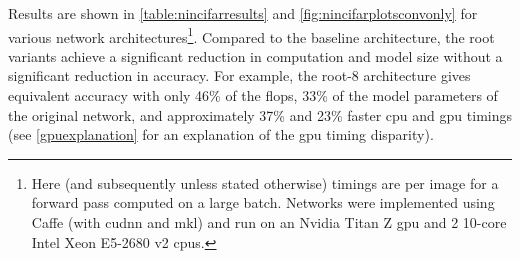 \documentclass[thesis]{subfiles}
\begin{document}
	Results are shown in \cref{table:nincifarresults} and \cref{fig:nincifarplotsconvonly} for various network architectures\footnote{Here (and subsequently unless stated otherwise) timings are per image for a forward pass computed on a large batch. Networks were implemented using Caffe (with \gls{cudnn} and \gls{mkl}) and run on an Nvidia Titan Z \gls{gpu} and 2 10-core Intel Xeon E5-2680 v2 \gls{cpu}s.}. Compared to the baseline architecture, the root variants achieve a significant reduction in computation and model size without a significant reduction in accuracy. For example, the root-8 architecture gives equivalent accuracy with only 46\% of the \gls{flops}, 33\% of the model parameters of the original network, and approximately 37\% and 23\% faster \gls{cpu} and \gls{gpu} timings (see \cref{gpuexplanation} for an explanation of the \gls{gpu} timing disparity).
	
	\newcommand{\covarlabels}[5]{%
		\begin{tikzpicture}[anchor=south west]
		\node [inner sep=0pt] (c)
		{
			#5
		};
		\ifx\covarwidth\undefined
		\newlength{\covarwidth}
		\newlength{\covarheight}
		\fi
		\settowidth{\covarwidth}{#5}
		\settoheight{\covarheight}{#5}
		\path[use as bounding box] (c.south west) rectangle (c.north east);
		\node [anchor=south east, xshift=\covarwidth, yshift=-0.2em] at (c.north west) {\tiny #4};
		\node [anchor=south west, xshift=0.25em, yshift=-1.05\covarheight, rotate=90] at (c.north west) {\tiny #2};
		\node [anchor=south, xshift=0.2\covarwidth, yshift=-0.2em] at (c.north west) {\scriptsize\texttt{#3}};
		\node [anchor=south, xshift=0.2em, yshift=-0.2\covarheight, rotate=90] at (c.north west) {\scriptsize\texttt{#1}};
		\end{tikzpicture}%
	}
	
\end{document}
